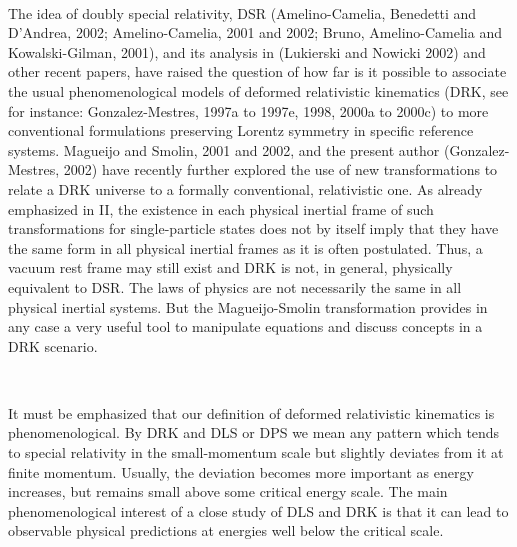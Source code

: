\documentclass[a4paper,12pt,dvips]{article}
\begin{document}
~
~ 

The idea of doubly special relativity, DSR (Amelino-Camelia, Benedetti and D'Andrea, 2002; Amelino-Camelia, 2001 and 2002; Bruno, Amelino-Camelia and Kowalski-Gilman, 2001), and its analysis in (Lukierski and Nowicki 2002) and other recent papers, have raised the question of how far is it possible to associate the usual phenomenological models of deformed relativistic kinematics (DRK, see for instance: Gonzalez-Mestres, 1997a to 1997e, 1998, 2000a to 2000c) to more conventional formulations preserving Lorentz symmetry in specific reference systems. Magueijo and Smolin, 2001 and 2002, and the present author (Gonzalez-Mestres, 2002) have recently further explored the use of new transformations to relate a DRK universe to a formally conventional, relativistic one. As already emphasized in II, the existence in each physical inertial frame of such transformations for single-particle states does not by itself imply that they have the same form in all physical inertial frames as it is often postulated. Thus, a vacuum rest frame may still exist and DRK is not, in general, physically equivalent to DSR. The laws of physics are not necessarily the same in all physical inertial systems. But the Magueijo-Smolin transformation provides in any case a very useful tool to manipulate equations and discuss concepts in a DRK scenario.

~

It must be emphasized that our definition of deformed relativistic kinematics is phenomenological. By DRK and DLS or DPS we mean any pattern which tends to special relativity in the small-momentum scale but slightly deviates from it at finite momentum. Usually, the deviation becomes more important as energy increases, but remains small above some critical energy scale. The main phenomenological interest of a close study of DLS and DRK is that it can lead to observable physical predictions at energies well below the critical scale.

~
\end{document}

